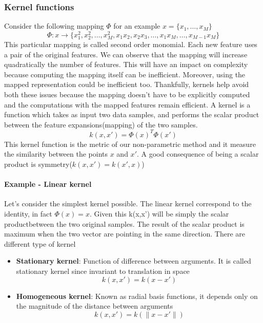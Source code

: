 \documentclass[main.tex]{subfiles}
\begin{document}
\subsubsection{Kernel functions}
Consider the following mapping $\Phi$ for an example $x=\{x_1, \dots, x_M\}$
\begin{equation*}
    \Phi:x \rightarrow \{x_1^2,x_2^2,\dots,x_M^2,x_1x_2,x_2x_3, \dots,x_1x_M, \dots, x_{M-1}x_M\}
\end{equation*}
This particular mapping is called second order monomial. Each new feature uses a pair of the original features. We can observe that the mapping will increase quadratically the number of features. This will have an impact on complexity because computing the mapping itself can be inefficient. Moreover, using the mapped representation could be inefficient too.
Thankfully, kernels help avoid both these issues because the mapping doesn't have to be explicitly computed and the computations with the mapped features remain efficient.
A kernel is a function which takes as input two data samples, and performs the scalar product between the feature expansions(mapping) of the two samples.
\begin{equation}
    k(x,x') = \Phi(x)^T \Phi(x')
\end{equation}
This kernel function is the metric of our non-parametric method and it measure the similarity between the points $x$ and $x'$. A good consequence of being a scalar product is symmetry($k(x,x') = k(x',x)$)
\paragraph{Example - Linear kernel} Let's consider the simplest kernel possible. The linear kernel correspond to the identity, in fact $\Phi(x) = x$. Given this k(x,x') will be simply the scalar product\footnotemark between the two original samples. The result of the scalar product is maximum when the two vector are pointing in the same direction. 
\newline
There are different type of kernel
\begin{itemize}
    \item \textbf{Stationary kernel}: Function of difference between arguments. It is called stationary kernel since invariant to translation in space
          \begin{equation*}
              k(x,x') = k(x-x')
          \end{equation*}
    \item \textbf{Homogeneous kernel}: Known as radial basis functions, it depends only on the magnitude of the distance between arguments
          \begin{equation*}
              k(x,x') = k(\|x-x'\|)
          \end{equation*}
\end{itemize}
\end{document}
